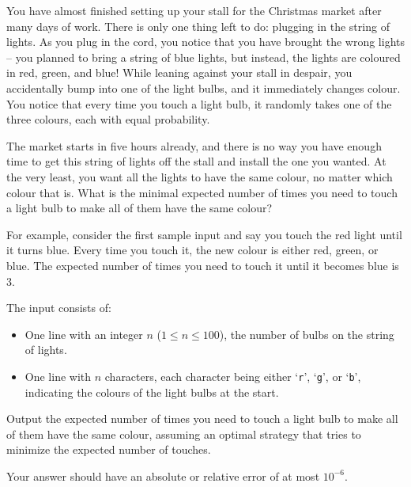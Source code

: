 

You have almost finished setting up your stall for the Christmas market after many days of work.
There is only one thing left to do: plugging in the string of lights.
As you plug in the cord, you notice that you have brought the wrong lights --
you planned to bring a string of blue lights,
but instead, the lights are coloured in red, green, and blue!
While leaning against your stall in despair,
you accidentally bump into one of the light bulbs,
and it immediately changes colour.
You notice that every time you touch a light bulb, it randomly takes one of the three colours,
each with equal probability.

The market starts in five hours already,
and there is no way you have enough time to get this string of lights off the stall
and install the one you wanted.
At the very least, you want all the lights to have the same colour, no matter
which colour that is.
What is the minimal expected number of times you need to touch a light bulb
to make all of them have the same colour?

For example, consider the first sample input
and say you touch the red light until it turns blue.
Every time you touch it, the new colour is either red, green, or blue.
The expected number of times you need to touch it until it becomes blue is $3$.

\begin{Input}
    The input consists of:
    \begin{itemize}
        \item One line with an integer $n$ ($1 \leq n \leq 100$),
            the number of bulbs on the string of lights.
        \item One line with $n$ characters, each character being either `\texttt r', `\texttt g', or `\texttt b',
            indicating the colours of the light bulbs at the start.
    \end{itemize}
\end{Input}

\begin{Output}
    Output the expected number of times you need to touch a light bulb
    to make all of them have the same colour,
    assuming an optimal strategy that tries to minimize the expected number of touches.

    Your answer should have an absolute or relative error of at most $10^{-6}$.
\end{Output}
